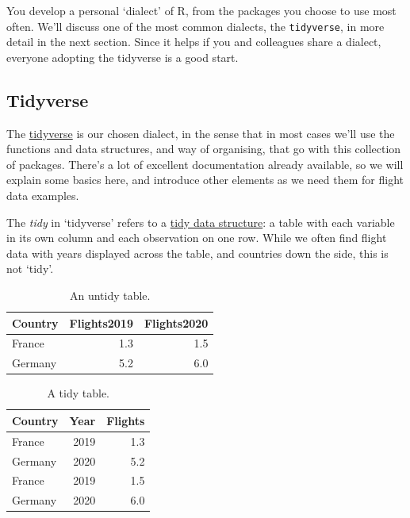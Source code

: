 \documentclass[
]{book}
\begin{document}
You develop a personal `dialect' of R, from the packages you choose to use most often. We'll discuss one of the most common dialects, the \texttt{tidyverse}, in more detail in the next section. Since it helps if you and colleagues share a dialect, everyone adopting the tidyverse is a good start.

\hypertarget{tidyverse}{%
\subsection{Tidyverse}\label{tidyverse}}

The \href{https://www.tidyverse.org}{tidyverse} is our chosen dialect, in the sense that in most cases we'll use the functions and data structures, and way of organising, that go with this collection of packages. There's a lot of excellent documentation already available, so we will explain some basics here, and introduce other elements as we need them for flight data examples.

The \emph{tidy} in `tidyverse' refers to a \href{https://r4ds.had.co.nz/tidy-data.html}{tidy data structure}: a table with each variable in its own column and each observation on one row. While we often find flight data with years displayed across the table, and countries down the side, this is not `tidy'.

\begin{table}

\caption{\label{tab:twotables}An untidy table.}
\centering
\begin{tabular}[t]{lrr}
\toprule
Country & Flights2019 & Flights2020\\
\midrule
France & 1.3 & 1.5\\
Germany & 5.2 & 6.0\\
\bottomrule
\end{tabular}
\end{table}

\begin{table}

\caption{\label{tab:twotables}A tidy table.}
\centering
\begin{tabular}[t]{lrr}
\toprule
Country & Year & Flights\\
\midrule
France & 2019 & 1.3\\
Germany & 2020 & 5.2\\
France & 2019 & 1.5\\
Germany & 2020 & 6.0\\
\bottomrule
\end{tabular}
\end{table}
\end{document}
